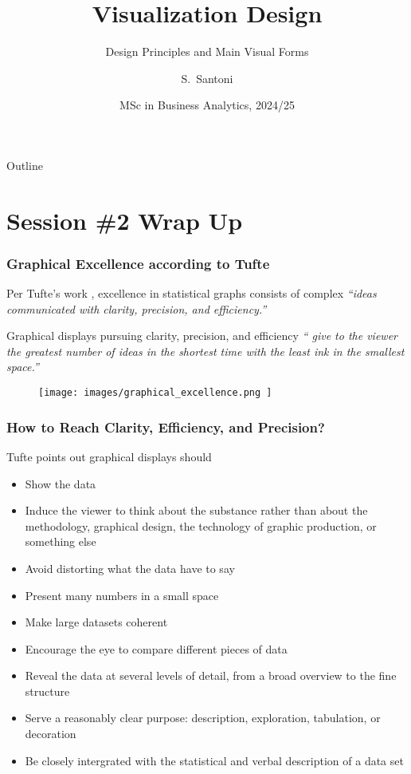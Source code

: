 \documentclass[aspectratio=1610]{beamer}
\title[Visualization Design]%
{Visualization Design}
\subtitle{Design Principles and Main Visual Forms}
\author{S.~Santoni\inst{1}}
\institute{
	\inst{1}%
	Bayes Business School
	}
\date{MSc in Business Analytics, 2024/25}
\begin{document}
\begin{frame}
	\titlepage
\end{frame}

\begin{frame}{Outline}
	\tableofcontents
\end{frame}

\section{Session \#2 Wrap Up}

\begin{frame}
	\frametitle{Graphical Excellence according to Tufte}
	Per Tufte's work \cite{tufte2001}, excellence in statistical graphs consists of complex
	\emph{``ideas communicated with clarity, precision, and
		efficiency.''}

	\vspace{1em}

	Graphical displays pursuing clarity, precision, and efficiency \emph{``
		give to the viewer the greatest number of ideas
		in the shortest time with the least ink in the smallest space.''}

	\begin{figure}
		\begin{small}
			\begin{center}
				\texttt{[image: 
					images/graphical\_excellence.png
				]}
			\end{center}
		\end{small}
	\end{figure}
\end{frame}

\begin{frame}
	\frametitle{How to Reach Clarity, Efficiency, and Precision?}
	Tufte points out graphical displays should
	\begin{itemize}
		\item
		      Show the data
		\item
		      Induce the viewer to think about the substance rather than
		      about the methodology, graphical design, the technology of
		      graphic production, or something else
		\item
		      Avoid distorting what the data have to say
		\item
		      Present many numbers in a small space
		\item
		      Make large datasets coherent
		\item
		      Encourage the eye to compare different pieces of data
		\item
		      Reveal the data at several levels of detail, from a broad
		      overview to the fine structure
		\item
		      Serve a reasonably clear purpose: description,
		      exploration, tabulation, or decoration
		\item
		      Be closely intergrated with the statistical and verbal
		      description of a data set
	\end{itemize}
\end{frame}
\end{document}

